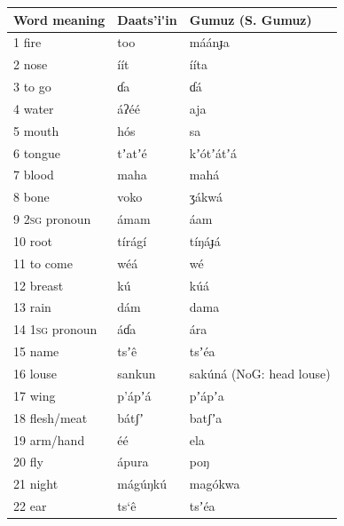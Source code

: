 \documentclass[output=paper]{langsci/langscibook}
\begin{document}
\begin{longtable}{p{}  p{} p{}}
\lsptoprule
Word meaning & Daats’i\'{ }in & Gumuz (S. Gumuz)\\
\midrule
1 fire & too & máánɟa \\

2 nose & íít & ííta \\

3 to go & ɗa & ɗá \\

4 water & áʔéé & aja \\

5 mouth & h\'{o}s & sa \\

6 tongue & tʼatʼé & kʼ\'{o}tʼátʼá \\

7 blood & maha & mahá \\

8 bone & voko & ʒákwá \\

9 2\textsc{sg} pronoun & ámam & áam \\

10 root & tírágí & tíŋáɟá \\

11 to come & wéá & wé \\

12 breast & k\'{u} & k\'{u}á \\

13 rain & dám & dama \\

14 1\textsc{sg} pronoun & áɗa & ára \\

15 name & tsʼ\^{e} & tsʼéa \\

16 louse & sankun & sak\'{u}ná (NoG: head louse) \\

17 wing & p’ápʼá & pʼápʼa \\

18 flesh/meat & bátʃʼ & batʃʼa \\

19 arm/hand & éé & ela \\

20 fly & ápura & poŋ \\

21 night & mág\'{u}ŋk\'{u} & mag\'{o}kwa \\

22 ear & ts‘\^{e} & tsʼéa \\


\end{longtable}
\end{document}
